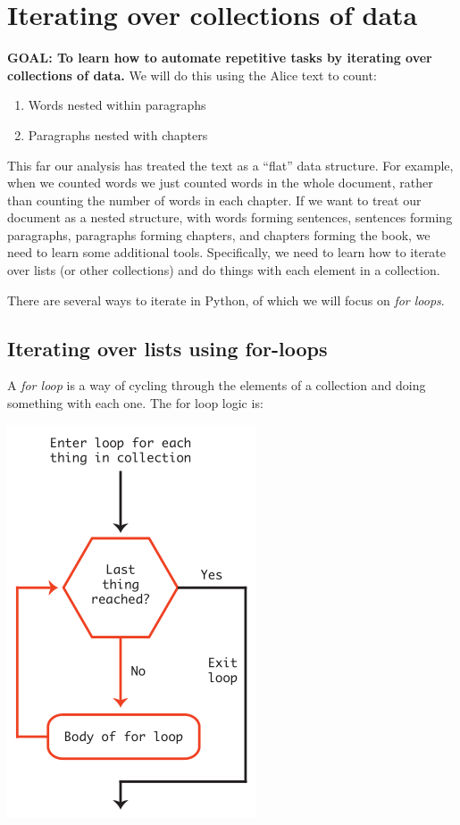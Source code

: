 \documentclass[]{book}
\providecommand{\tightlist}{%
  \setlength{\itemsep}{0pt}\setlength{\parskip}{0pt}}
\begin{document}
\hypertarget{iterating-over-collections-of-data}{%
\section{Iterating over collections of data}\label{iterating-over-collections-of-data}}

\textbf{GOAL: To learn how to automate repetitive tasks by iterating over collections of data.} We will do this using the Alice text to count:

\begin{enumerate}
\def\labelenumi{\arabic{enumi}.}
\tightlist
\item
  Words nested within paragraphs
\item
  Paragraphs nested with chapters
\end{enumerate}

This far our analysis has treated the text as a ``flat'' data structure. For example, when we counted words we just counted words in the whole document, rather than counting the number of words in each chapter. If we want to treat our document as a nested structure, with words forming sentences, sentences forming paragraphs, paragraphs forming chapters, and chapters forming the book, we need to learn some additional tools. Specifically, we need to learn how to iterate over lists (or other collections) and do things with each element in a collection.

There are several ways to iterate in Python, of which we will focus on \emph{for loops}.

\hypertarget{iterating-over-lists-using-for-loops}{%
\subsection{Iterating over lists using for-loops}\label{iterating-over-lists-using-for-loops}}

A \emph{for loop} is a way of cycling through the elements of a collection and doing something with each one. The for loop logic is:

\includegraphics{Python/PythonIntro/images/for_loop_pic_small.png}
\end{document}

